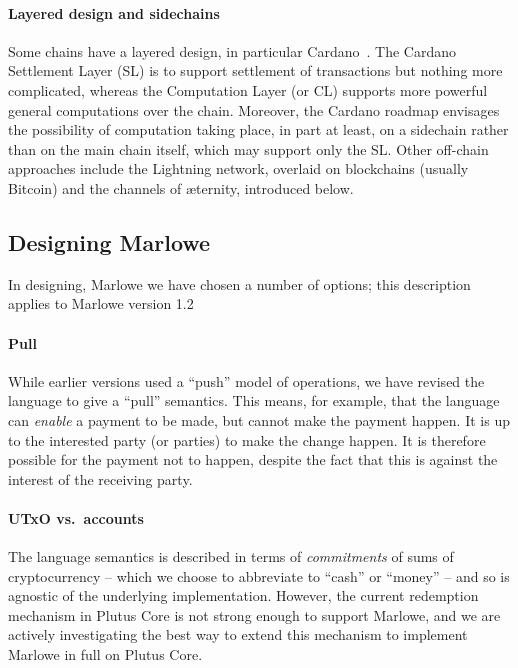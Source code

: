 \documentclass[
      acmsmall
    , screen
    , review=true
  ]{acmart}
\begin{document}
\paragraph{Layered design and sidechains}

Some chains have a layered design, in particular Cardano~\cite{cardano}. The Cardano Settlement Layer (SL) is to support settlement of transactions but nothing more complicated, whereas the Computation Layer (or CL) supports more powerful general computations over the chain. Moreover, the Cardano roadmap \cite{cardano-rationale} envisages the possibility of computation taking place, in part at least, on a sidechain rather than on the main chain itself, which may support only the SL. Other off-chain approaches include the Lightning network, overlaid on blockchains (usually Bitcoin) and the channels of \ae{}ternity, introduced below.

\subsection{Designing Marlowe}

In designing, Marlowe we have chosen a number of options; this description applies to Marlowe version 1.2 

\paragraph{Pull} 

While earlier versions used a ``push'' model of operations, we have revised the language to give a ``pull'' semantics. 
This means, for example, that the language can \emph{enable} a payment to be made, but cannot make the payment happen. 
It is up to the interested party (or parties) to make the change happen. It is therefore possible for the payment not to 
happen, despite the fact that this is against the interest of the receiving party.


\paragraph{UTxO vs.\ accounts}

The language semantics is described in terms of \emph{commitments} of sums of cryptocurrency -- which we choose to 
abbreviate to ``cash'' or ``money'' -- and so is agnostic of the underlying implementation.  However, the current 
redemption mechanism in Plutus Core is not strong enough to support Marlowe, and we are actively investigating the best 
way to extend this mechanism to implement Marlowe in full on Plutus Core.
\end{document}

